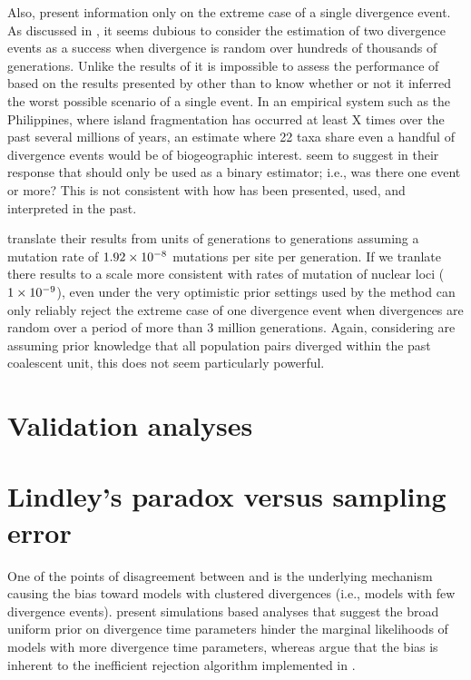 \documentclass[letterpaper,12pt]{article}
\begin{document}
\begin{linenumbers}
Also, \citet{Hickerson2013} present information only on the extreme case of a
single divergence event.
As discussed in \citet{Oaks2012}, it seems dubious to consider the estimation
of two divergence events as a success when divergence is random over hundreds
of thousands of generations.
Unlike the results of \citet{Oaks2012} it is impossible to assess the
performance of \msb based on the results presented by \cite{Hickerson2013}
other than to know whether or not it inferred the worst possible scenario of a
single event.
In an empirical system such as the Philippines, where island fragmentation
has occurred at least X times over the past several millions of years, an
estimate where 22 taxa share even a handful of divergence events would be
of biogeographic interest.
\citet{Hickerson2013} seem to suggest in their response that \msb should only
be used as a binary estimator; i.e., was there one event or more?
This is not consistent with how \msb has been presented, used, and interpreted
in the past.

\citet{Hickerson2013} translate their results from units of
\globalcoalunit generations to generations assuming a mutation rate of
$1.92\times 10^{-8}$ mutations per site per generation.
If we tranlate there results to a scale more consistent with rates of mutation
of nuclear loci ($1\times 10^{-9}$), even under the very optimistic prior settings used
by \citet{Hickerson2013} the method can only reliably reject the extreme case
of one divergence event when divergences are random over a period of more than
3 million generations.
Again, considering \citet{Hickerson2013} are assuming prior knowledge that
all population pairs diverged within the past coalescent unit, this
does not seem particularly powerful.



\section{Validation analyses}



\section*{Lindley's paradox versus sampling error}
One of the points of disagreement between \citet{Hickerson2013} and
\citet{Oaks2012} is the underlying mechanism causing the bias toward models
with clustered divergences (i.e., models with few divergence events).
\citet{Oaks2012} present simulations based analyses that suggest the broad
uniform prior on divergence time parameters hinder the marginal likelihoods of
models with more divergence time parameters, whereas \citet{Hickerson2013}
argue that the bias is inherent to the inefficient rejection algorithm
implemented in \msb.


\end{linenumbers}
\end{document}
